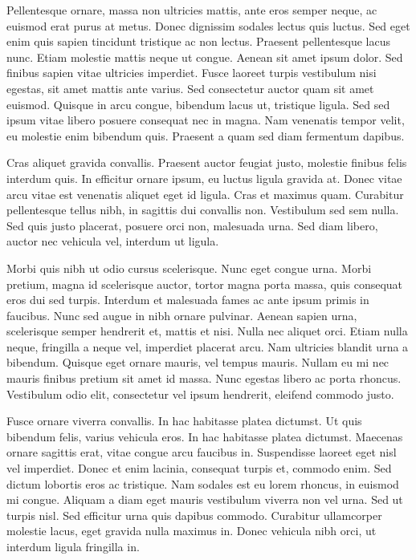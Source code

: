 \documentclass[10pt]{llncs}
\begin{document}
Pellentesque ornare, massa non ultricies mattis, ante eros semper neque, ac euismod erat purus at metus. Donec dignissim sodales lectus quis luctus. Sed eget enim quis sapien tincidunt tristique ac non lectus. Praesent pellentesque lacus nunc. Etiam molestie mattis neque ut congue. Aenean sit amet ipsum dolor. Sed finibus sapien vitae ultricies imperdiet. Fusce laoreet turpis vestibulum nisi egestas, sit amet mattis ante varius. Sed consectetur auctor quam sit amet euismod. Quisque in arcu congue, bibendum lacus ut, tristique ligula. Sed sed ipsum vitae libero posuere consequat nec in magna. Nam venenatis tempor velit, eu molestie enim bibendum quis. Praesent a quam sed diam fermentum dapibus.

Cras aliquet gravida convallis. Praesent auctor feugiat justo, molestie finibus felis interdum quis. In efficitur ornare ipsum, eu luctus ligula gravida at. Donec vitae arcu vitae est venenatis aliquet eget id ligula. Cras et maximus quam. Curabitur pellentesque tellus nibh, in sagittis dui convallis non. Vestibulum sed sem nulla. Sed quis justo placerat, posuere orci non, malesuada urna. Sed diam libero, auctor nec vehicula vel, interdum ut ligula.

Morbi quis nibh ut odio cursus scelerisque. Nunc eget congue urna. Morbi pretium, magna id scelerisque auctor, tortor magna porta massa, quis consequat eros dui sed turpis. Interdum et malesuada fames ac ante ipsum primis in faucibus. Nunc sed augue in nibh ornare pulvinar. Aenean sapien urna, scelerisque semper hendrerit et, mattis et nisi. Nulla nec aliquet orci. Etiam nulla neque, fringilla a neque vel, imperdiet placerat arcu. Nam ultricies blandit urna a bibendum. Quisque eget ornare mauris, vel tempus mauris. Nullam eu mi nec mauris finibus pretium sit amet id massa. Nunc egestas libero ac porta rhoncus. Vestibulum odio elit, consectetur vel ipsum hendrerit, eleifend commodo justo.

Fusce ornare viverra convallis. In hac habitasse platea dictumst. Ut quis bibendum felis, varius vehicula eros. In hac habitasse platea dictumst. Maecenas ornare sagittis erat, vitae congue arcu faucibus in. Suspendisse laoreet eget nisl vel imperdiet. Donec et enim lacinia, consequat turpis et, commodo enim. Sed dictum lobortis eros ac tristique. Nam sodales est eu lorem rhoncus, in euismod mi congue. Aliquam a diam eget mauris vestibulum viverra non vel urna. Sed ut turpis nisl. Sed efficitur urna quis dapibus commodo. Curabitur ullamcorper molestie lacus, eget gravida nulla maximus in. Donec vehicula nibh orci, ut interdum ligula fringilla in.
\end{document}
